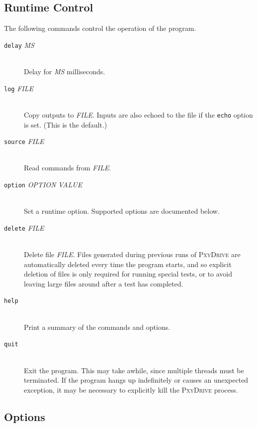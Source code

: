 \documentclass[11pt]{article}
\newcommand{\pxydrive}{\textsc{PxyDrive}}
\begin{document}
\subsection*{Runtime Control}

The following commands control the operation of the program.

\begin{description}
\item[\texttt{delay} \textit{MS}]  $\;$ \\
    Delay for \textit{MS} milliseconds.

\item[\texttt{log} \textit{FILE}]  $\;$ \\
    Copy outputs to \textit{FILE}\@.  Inputs are also echoed to the file
    if the \texttt{echo} option is set. (This is the default.)

\item[\texttt{source} \textit{FILE}]  $\;$ \\
    Read commands from \textit{FILE}\@.

\item[\texttt{option} \textit{OPTION} \textit{VALUE}]  $\;$ \\
    Set a runtime option.  Supported options are documented below.

\item[\texttt{delete} \textit{FILE}]  $\;$ \\
    Delete file \textit{FILE}\@.  Files generated during previous runs
    of \pxydrive{} are automatically deleted every time the program
    starts, and so explicit deletion of files is only required for
    running special tests, or to avoid leaving large files around
    after a test has completed.

\item[\texttt{help}] $\;$ \\
Print a summary of the commands and options.

\item[\texttt{quit}]  $\;$ \\
Exit the program.  This may take awhile, since multiple threads must
be terminated.  If the program hangs up indefinitely or causes an
unexpected exception, it may be necessary to explicitly kill the
\pxydrive{} process.
\end{description}

\subsection*{Options}
\end{document}
